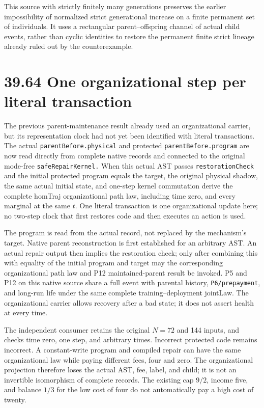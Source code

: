 \documentclass[
  english,
  11pt,
  oneside]{book}
\begin{document}
This source with strictly finitely many generations preserves the earlier impossibility of normalized strict generational increase on a finite permanent set of individuals. It uses a rectangular parent--offspring channel of actual child events, rather than cyclic identities to restore the permanent finite strict lineage already ruled out by the counterexample.

\section{39.64 One organizational step per literal transaction}\label{one-organizational-step-per-literal-transaction}

The previous parent-maintenance result already used an organizational carrier, but its representation clock had not yet been identified with literal transactions. The actual \nolinkurl{parentBefore.physical} and protected \nolinkurl{parentBefore.program} are now read directly from complete native records and connected to the original mode-free \nolinkurl{safeRepairKernel.} When this actual AST passes \nolinkurl{restorationCheck} and the initial protected program equals the target, the original physical shadow, the same actual initial state, and one-step kernel commutation derive the complete homTraj organizational path law, including time zero, and every marginal at the same \(t\). One literal transaction is one organizational update here; no two-step clock that first restores code and then executes an action is used.

The program is read from the actual record, not replaced by the mechanism's target. Native parent reconstruction is first established for an arbitrary AST. An actual repair output then implies the restoration check; only after combining this with equality of the initial program and target may the corresponding organizational path law and P12 maintained-parent result be invoked. P5 and P12 on this native source share a full event with parental history, \nolinkurl{P6/prepayment}, and long-run life under the same complete training--deployment jointLaw. The organizational carrier allows recovery after a bad state; it does not assert health at every time.

The independent consumer retains the original \(N=72\) and 144 inputs, and checks time zero, one step, and arbitrary times. Incorrect protected code remains incorrect. A constant-write program and compiled repair can have the same organizational law while paying different fees, four and zero. The organizational projection therefore loses the actual AST, fee, label, and child; it is not an invertible isomorphism of complete records. The existing cap \(9/2\), income five, and balance \(1/3\) for the low cost of four do not automatically pay a high cost of twenty.
\end{document}
